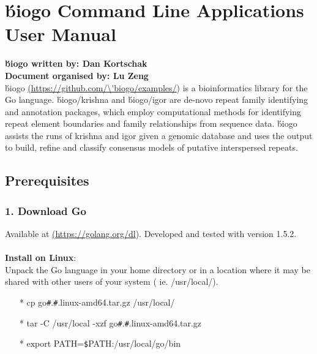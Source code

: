 \documentclass[12pt]{report}
\begin{document}
 \sloppy

\author{Author Name}
\date{Day Month Year}


\section*{\'biogo Command Line Applications User Manual}
\textbf{\'biogo written by: Dan Kortschak} \\
\textbf{Document organised by: Lu Zeng} \\

\'biogo \href{<url>}(\url{https://github.com/\'biogo/examples/}) is a bioinformatics library for the Go language. \'biogo/krishna and \'biogo/igor are de-novo repeat family identifying and annotation packages, which employ computational methods for identifying repeat element boundaries and family relationships from sequence data. \'biogo assists the runs of krishna and igor given a genomic database and uses the output to build, refine and classify consensus models of putative interspersed repeats. 

\subsection*{{Prerequisites}}

\subsubsection{1. Download Go }
Available at \href{<url>} (\url{https://golang.org/dl}). Developed and tested with version 1.5.2. \\\\
\textbf{Install on Linux}: \\
Unpack the Go language in your home directory or in a location where it may be shared with other users of your system ( ie. /usr/local/).

\begin{enumerate}
	\item[*] cp go\texttt{\#}.\texttt{\#}.linux-amd64.tar.gz /usr/local/ 
	\item[*] tar -C /usr/local -xzf go\texttt{\#}.\texttt{\#}.linux-amd64.tar.gz
	\item[*] export PATH=\texttt{\$}PATH:/usr/local/go/bin
\end{enumerate}
\end{document}
